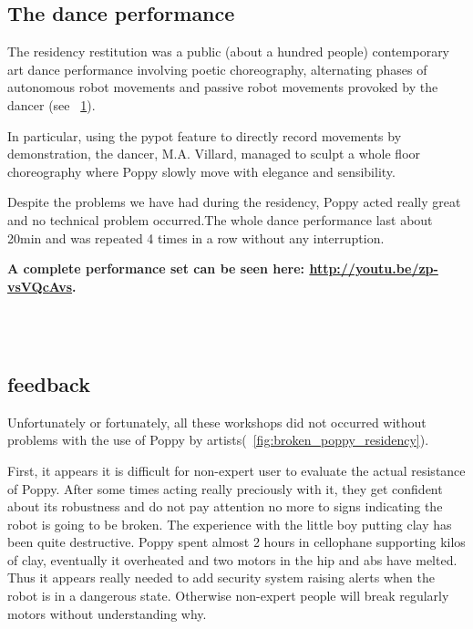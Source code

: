 \subsection{The dance performance} %

The residency restitution was a public (about a hundred people) contemporary art dance performance involving poetic choreography, alternating phases of autonomous robot movements and passive robot movements provoked by the dancer (see \figurename~\ref{fig:poppy_dance_performance}).

In particular, using the pypot feature to directly record movements by demonstration, the dancer, M.A. Villard, managed to sculpt a whole floor choreography where Poppy slowly move with elegance and sensibility.

Despite the problems we have had during the residency, Poppy acted really great and no technical problem occurred.The whole dance performance last about 20min and was repeated 4 times in a row without any interruption.

\textbf{A complete performance set can be seen here: \url{http://youtu.be/zp-vsVQcAvs}.}

\begin{figure}[]
\centering
    \hfil
    \\
    \hfil
    \\
    \caption{}
    \label{fig:poppy_dance_performance}
\end{figure}




\subsection{feedback} %


Unfortunately or fortunately, all these workshops did not occurred without problems with the use of Poppy by artists(\figurename~\ref{fig:broken_poppy_residency}).

First, it appears it is difficult for non-expert user to evaluate the actual resistance of Poppy. After some times acting really preciously with it, they get confident about its robustness and do not pay attention no more to signs indicating the robot is going to be broken. The experience with the little boy putting clay has been quite destructive. Poppy spent almost 2 hours in cellophane supporting kilos of clay, eventually it overheated and two motors in the hip and abs have melted.
Thus it appears really needed to add security system raising alerts when the robot is in a dangerous state.  Otherwise non-expert people will break regularly motors without understanding why.


